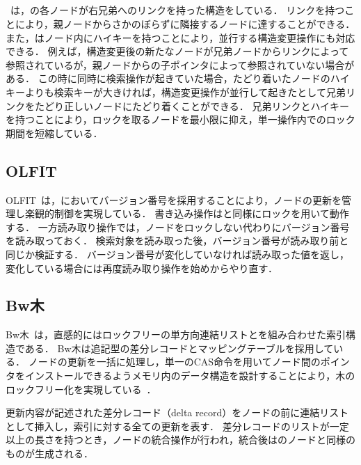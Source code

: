 \subsection{\Blinktree{}}

\Blinktree{}~\cite{tods1981:Lehman}は，\Bptree{}の各ノードが右兄弟へのリンクを持った構造をしている．
リンクを持つことにより，親ノードからさかのぼらずに隣接するノードに達することができる．
また，\Blinktree{}はノード内にハイキーを持つことにより，並行する構造変更操作にも対応できる．
例えば，構造変更後の新たなノードが兄弟ノードからリンクによって参照されているが，親ノードからの子ポインタによって参照されていない場合がある．
この時に同時に検索操作が起きていた場合，たどり着いたノードのハイキーよりも検索キーが大きければ，構造変更操作が並行して起きたとして兄弟リンクをたどり正しいノードにたどり着くことができる．
兄弟リンクとハイキーを持つことにより，ロックを取るノードを最小限に抑え，単一操作内でのロック期間を短縮している．

\subsection{OLFIT}

OLFIT~\cite{vldb2001:Cha}は，\Blinktree{}においてバージョン番号を採用することにより，ノードの更新を管理し楽観的制御を実現している．
書き込み操作は\Blinktree{}と同様にロックを用いて動作する．
一方読み取り操作では，ノードをロックしない代わりにバージョン番号を読み取っておく．
検索対象を読み取った後，バージョン番号が読み取り前と同じか検証する．
バージョン番号が変化していなければ読み取った値を返し，変化している場合には再度読み取り操作を始めからやり直す．

\subsection{Bw木}

Bw木~\cite{book:Bwtree}は，直感的にはロックフリーの単方向連結リストと\Bptree{}を組み合わせた索引構造である．
Bw木は追記型の差分レコードとマッピングテーブルを採用している．
ノードの更新を一括に処理し，単一のCAS命令を用いてノード間のポインタをインストールできるようメモリ内のデータ構造を設計することにより，木のロックフリー化を実現している~\cite{book:DatabaseInternals}．

更新内容が記述された差分レコード（delta record）をノードの前に連結リストとして挿入し，索引に対する全ての更新を表す．
差分レコードのリストが一定以上の長さを持つとき，ノードの統合操作が行われ，統合後は\Bptree{}のノードと同様のものが生成される．

